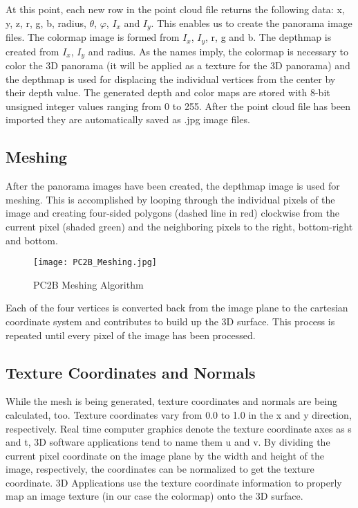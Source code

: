 At this point, each new row in the point cloud file returns the following data: x, y, z, r, g, b, radius, $\theta$, $\varphi$,  $I_x$ and  $I_y$. This enables us to create the panorama image files. The colormap image is formed from $I_x$, $I_y$, r, g and b. The depthmap is created from $I_x$, $I_y$ and radius. As the names imply, the colormap is necessary to color the 3D panorama (it will be applied as a texture for the 3D panorama) and the depthmap is used for displacing the individual vertices from the center by their depth value. The generated depth and color maps are stored with 8-bit unsigned integer values ranging from 0 to 255. After the point cloud file has been imported they are automatically saved as .jpg image files.

\subsection{Meshing}

After the panorama images have been created, the depthmap image is used for meshing. This is accomplished by looping through the individual pixels of the image and creating four-sided polygons (dashed line in red) clockwise from the current pixel (shaded green) and the neighboring pixels to the right, bottom-right and bottom.

\begin{figure}[h]
	\centering
	\texttt{[image: PC2B\_Meshing.jpg]}
	\caption{PC2B Meshing Algorithm}
	\label{fig:pc2b_meshing}
\end{figure}

Each of the four vertices is converted back from the image plane to the cartesian coordinate system and contributes to build up the 3D surface. This process is repeated until every pixel of the image has been processed.

\subsection{Texture Coordinates and Normals}  \label{section_texture_coordinates_and_normals}

While the mesh is being generated, texture coordinates and normals are being calculated, too. Texture coordinates vary from 0.0 to 1.0 in the x and y direction, respectively. Real time computer graphics denote the texture coordinate axes as s and t, 3D software applications tend to name them u and v. By dividing the current pixel coordinate on the image plane by the width and height of the image, respectively, the coordinates can be normalized to get the texture coordinate. 3D Applications use the texture coordinate information to properly map an image texture (in our case the colormap) onto the 3D surface.


